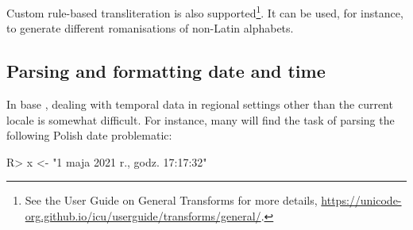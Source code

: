\documentclass[nojss]{jss}
\begin{document}

Custom rule-based transliteration is also
supported\footnote{See the  User Guide on {General Transforms}
for more details,
\url{https://unicode-org.github.io/icu/userguide/transforms/general/}.
}. It can be used, for instance, to generate different romanisations
of non-Latin alphabets.







%








\subsection{Parsing and formatting date and time}\label{Sec:datetime}

In base , dealing with temporal data in regional
settings other than the current locale is somewhat difficult.
For instance, many will find the task of parsing the following Polish date problematic:

\begin{Schunk}
\begin{Sinput}
R> x <- "1 maja 2021 r., godz. 17:17:32"
\end{Sinput}
\end{Schunk}
\end{document}
